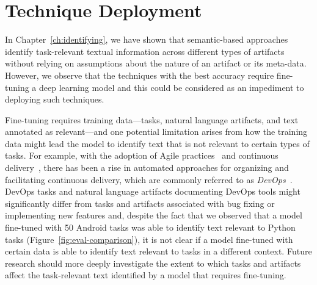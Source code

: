 \section{Technique Deployment}
\label{cp7:deployment}






In Chapter~\ref{ch:identifying}, we have shown that semantic-based approaches identify task-relevant textual information across
different types of artifacts without relying on
assumptions about the nature of an artifact or its meta-data.
However, we
observe that the techniques with the best accuracy require fine-tuning 
a deep learning model
and this could be considered as an impediment to deploying such techniques. 


Fine-tuning requires training data---tasks, natural language artifacts, and text annotated as relevant---and
one potential limitation arises from how the training data might lead the model to identify 
text that is not relevant to certain types of tasks.
For example, with the adoption of Agile practices~\cite{fowler2001agile} and continuous  delivery~\cite{humble2010continuous}, 
there has been a rise in automated approaches for organizing and facilitating 
continuous delivery, which are commonly referred to as \textit{DevOps}~\cite{senapathi2018devops, leite2019ops}.
DevOps tasks and natural language artifacts documenting DevOps tools 
might significantly differ from tasks and artifacts associated with bug fixing or implementing new features
and, despite the fact that we observed that a model fine-tuned with 50 Android tasks 
was able to identify text relevant to Python tasks (Figure~\ref{fig:eval-comparison}), 
it is not clear if a model fine-tuned with certain data is able to identify text relevant to tasks 
in a different context. 
Future research should more deeply investigate the extent to which 
tasks and artifacts affect the task-relevant text identified by a model 
that requires fine-tuning.







